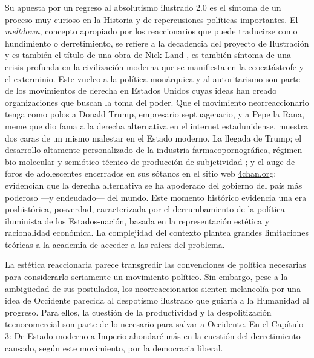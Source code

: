 Su apuesta por un regreso al absolutismo ilustrado 2.0 es el síntoma de un proceso muy curioso en la Historia y de repercusiones políticas importantes. El \emph{meltdown}, concepto apropiado por los reaccionarios que puede traducirse como hundimiento o derretimiento, se refiere a la decadencia del proyecto de Ilustración y es también el título de una obra de Nick Land \autocite{landFangedNoumenaCollected2018}, es también síntoma de una crisis profunda en la civilización moderna que se manifiesta en la ecocatástrofe y el exterminio. Este vuelco a la política monárquica y al autoritarismo son parte de los movimientos de derecha en Estados Unidos cuyas ideas han creado organizaciones que buscan la toma del poder. Que el movimiento neorreaccionario tenga como polos a Donald Trump, empresario septuagenario, y a Pepe la Rana, meme que dio fama a la derecha alternativa \autocite{huiUnhappyConsciousnessNeoreactionaries2017} en el internet estadunidense, muestra dos caras de un mismo malestar en el Estado moderno. La llegada de Trump; el desarrollo altamente personalizado de la industria farmacopornográfica, régimen bio-molecular y semiótico-técnico de producción de subjetividad \autocite{preciadoTestoYonqui2008}; y el auge de foros de adolescentes encerrados en sus sótanos en el sitio web \url{4chan.org}; evidencian que la derecha alternativa se ha apoderado del gobierno del país más poderoso ---y endeudado--- del mundo. Este momento histórico evidencia una era poshistórica, posverdad, caracterizada por el derrumbamiento de la política iluminista de los Estados-nación, basada en la representación estética y racionalidad económica. La complejidad del contexto plantea grandes limitaciones teóricas a la academia de acceder a las raíces del problema.

La estética reaccionaria parece transgredir las convenciones de  política necesarias para considerarlo seriamente un movimiento político. Sin embargo, pese a la ambigüedad de sus postulados, los neorreaccionarios sienten melancolía por una idea de Occidente parecida al despotismo ilustrado que guiaría a la Humanidad al progreso. Para ellos, la cuestión de la productividad y la despolitización tecnocomercial son parte de lo necesario para salvar a Occidente. En el Capítulo 3: De Estado moderno a Imperio ahondaré más en la cuestión del derretimiento causado, según este movimiento, por la democracia liberal.

